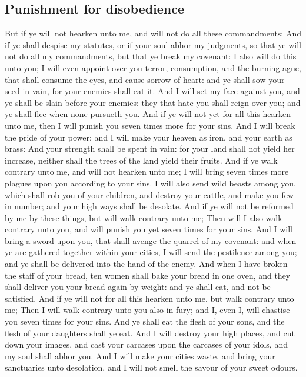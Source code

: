 \begin{biblechapter}
\section*{Punishment for disobedience}
\verse But if ye will not hearken unto me, and will not do all these commandments;
\verse And if ye shall despise my statutes, or if your soul abhor my judgments, so that ye will not do all my commandments, but that ye break my covenant:
\verse I also will do this unto you; I will even appoint over you terror, consumption, and the burning ague, that shall consume the eyes, and cause sorrow of heart: and ye shall sow your seed in vain, for your enemies shall eat it.
\verse And I will set my face against you, and ye shall be slain before your enemies: they that hate you shall reign over you; and ye shall flee when none pursueth you.
\verse And if ye will not yet for all this hearken unto me, then I will punish you seven times more for your sins.
\verse And I will break the pride of your power; and I will make your heaven as iron, and your earth as brass:
\verse And your strength shall be spent in vain: for your land shall not yield her increase, neither shall the trees of the land yield their fruits.
\verse And if ye walk contrary unto me, and will not hearken unto me; I will bring seven times more plagues upon you according to your sins.
\verse I will also send wild beasts among you, which shall rob you of your children, and destroy your cattle, and make you few in number; and your high ways shall be desolate.
\verse And if ye will not be reformed by me by these things, but will walk contrary unto me;
\verse Then will I also walk contrary unto you, and will punish you yet seven times for your sins.
\verse And I will bring a sword upon you, that shall avenge the quarrel of my covenant: and when ye are gathered together within your cities, I will send the pestilence among you; and ye shall be delivered into the hand of the enemy.
\verse And when I have broken the staff of your bread, ten women shall bake your bread in one oven, and they shall deliver you your bread again by weight: and ye shall eat, and not be satisfied.
\verse And if ye will not for all this hearken unto me, but walk contrary unto me;
\verse Then I will walk contrary unto you also in fury; and I, even I, will chastise you seven times for your sins.
\verse And ye shall eat the flesh of your sons, and the flesh of your daughters shall ye eat.
\verse And I will destroy your high places, and cut down your images, and cast your carcases upon the carcases of your idols, and my soul shall abhor you.
\verse And I will make your cities waste, and bring your sanctuaries unto desolation, and I will not smell the savour of your sweet odours.

\end{biblechapter}
